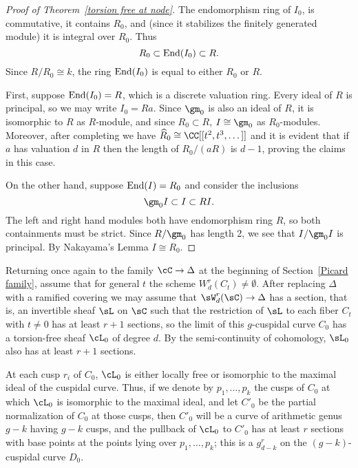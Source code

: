 \begin{proof}[Proof of Theorem~\ref{torsion free at node}] 

\def\End{{\rm End}}

The endomorphism ring of $I_0$, is commutative, it contains $R_0$,  and (since it stabilizes the finitely
generated module) it is integral over $R_0$. Thus
$$
R_0 \subset \End(I_0) \subset R.
$$
Since
$R/R_0 \cong k$, the ring $\End(I_0)$ is equal to either 
$R_0$ or $R$. 

First, suppose
$\End(I_{0})=R$, which is a discrete valuation ring. Every ideal of $R$ is principal, so we may write $I_{0} = Ra$.
 Since $\gm_0$ is also an ideal of $R$, it is isomorphic to $R$
as $R$-module, and since $R_0\subset R$,
$I \cong \gm_0$ as $R_0$-modules. Moreover, after completing we have $\widehat R_{0} \cong \CC[[t^{2}, t^{3}, \dots]]$ and it is evident that if $a$ has valuation $d$ in $R$ then the length of $R_{0}/(aR)$ is $d-1$, proving the claims in this case.

On the other hand, suppose
$\End(I)=R_0$
 and consider the inclusions
$$
\gm_0 I \subset I \subset R I.
$$
The left and right hand modules both have endomorphism ring $R$,
so both containments must be strict. Since $R/\gm_0$ has length 2,
we see that $I/\gm_0 I$ is principal. By Nakayama's Lemma $I\cong R_0$.
\end{proof}

Returning once again to the family $\cC \to \Delta$ at the beginning of Section~\ref{Picard family}, assume that for general $t$ the scheme $W^{r}_{d}(C_t)\neq \emptyset$. After replacing $\Delta$ with a ramified covering
we may assume that $\sW^{r}_{d}(\sC) \to \Delta$ has a section, that is, an invertible sheaf $\sL$ on $\sC$
 such that the restriction of $\sL$ to each fiber $C_{t}$ with $t\neq 0$ has at least $r+1$ sections, so the limit of this $g$-cuspidal curve $C_0$ has a torsion-free sheaf $\cL_0$ of degree $d$. By the semi-continuity
 of cohomology, $\sL_{0}$ also has at least $r+1$ sections. 

At each cusp $r_i$ of $C_0$, $\cL_0$ is either locally free or isomorphic to the maximal ideal of the cuspidal curve. Thus, if we denote by $p_1,\dots, p_k$ the cusps of $C_0$ at which $\cL_0$ is isomorphic to the maximal ideal, and let $C'_{0}$ be the partial normalization of $C_0$ at those cusps, then $C'_{0}$ will be a curve of arithmetic genus $g-k$ having $g-k$ cusps, and the pullback of $\cL_0$ to $C'_{0}$ has at least $r$ sections with base points at the points lying over $p_1,\dots,p_k$;  this is a $g^r_{d-k}$ on the $(g-k)$-cuspidal curve  $D_0$.



